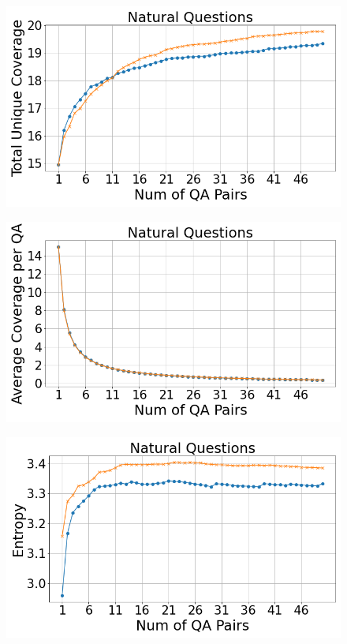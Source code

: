 \documentclass[11pt]{article}
\begin{document}
\begin{figure}[ht]
\centering
\begin{minipage}{0.33\textwidth}
    \includegraphics[width=\linewidth]{submissions/Tung2023/figs/Natural Questions_Total Unique Coverage.png}
    \label{fig:narrativeqa-total-unique-coverage}
\end{minipage}%
\begin{minipage}{0.33\textwidth}
    \includegraphics[width=\linewidth]{submissions/Tung2023/figs/Natural Questions_Average Coverage per QA.png}
    \label{fig:narrativeqa-avg-cov-per-qa}
\end{minipage}%
\begin{minipage}{0.33\textwidth}
    \includegraphics[width=\linewidth]{submissions/Tung2023/figs/Natural Questions_Entropy.png}
    \label{fig:narrativeqa-entropy}
\end{minipage}



\end{figure}
\end{document}
